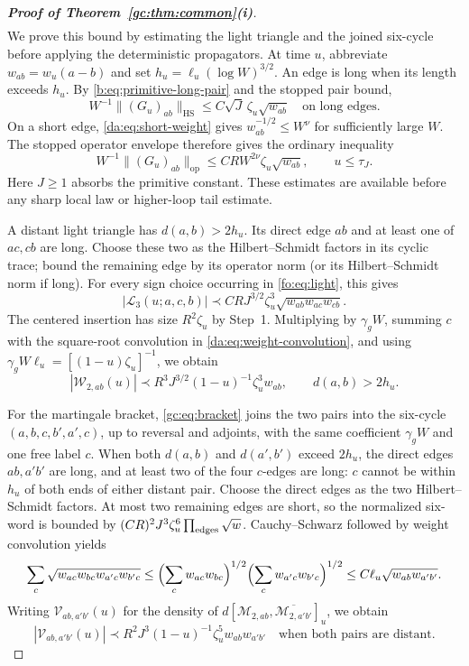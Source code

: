 \documentclass[11pt]{article}
\numberwithin{equation}{section}
\theoremstyle{remark}
\newcommand{\cL}{\mathcal L}
\newcommand{\op}{\mathrm{op}}
\newcommand{\HS}{\mathrm{HS}}
\begin{document}
\begin{proof}[\textbf{Proof of Theorem~\ref{gc:thm:common}(i)}]
\begin{equation}
\begin{aligned}
 \end{aligned}
\end{equation}
We prove this bound by estimating the light triangle and the joined
six-cycle before applying the deterministic propagators.
At time $u$, abbreviate $w_{ab}=w_u(a-b)$ and set
$h_u=\ell_u(\log W)^{3/2}$. An edge is long when its length exceeds
$h_u$. By \eqref{b:eq:primitive-long-pair} and the stopped pair bound,
\[
 W^{-1}\|(G_u)_{ab}\|_{\HS}
 \le C\sqrt J\,\zeta_u\sqrt{w_{ab}}\quad\text{on long edges}.
\]
On a short edge, \eqref{da:eq:short-weight} gives
$w_{ab}^{-1/2}\le W^\nu$ for sufficiently large $W$.
The stopped operator envelope therefore gives the ordinary inequality
\[
 W^{-1}\|(G_u)_{ab}\|_{\op}
 \le CRW^{2\nu}\zeta_u\sqrt{w_{ab}},\qquad u\le\tau_J.
\]
Here $J\ge1$ absorbs the primitive constant. These estimates are
available before any sharp local law or higher-loop tail estimate.

A distant light triangle has $d(a,b)>2h_u$. Its direct edge $ab$
and at least one of $ac,cb$ are long. Choose these two as the
Hilbert--Schmidt factors in its cyclic trace; bound the remaining
edge by its operator norm (or its Hilbert--Schmidt norm if long).
For every sign choice occurring in \eqref{fo:eq:light}, this gives
\[
 |\cL_3(u;a,c,b)|\prec
 CRJ^{3/2}\zeta_u^3\sqrt{w_{ab}w_{ac}w_{cb}}.
\]
The centered insertion has size $R^2\zeta_u$ by Step~1. Multiplying
by $\gamma_gW$, summing $c$ with the square-root convolution in
\eqref{da:eq:weight-convolution}, and using
$\gamma_gW\ell_u=[(1-u)\zeta_u]^{-1}$, we obtain
\begin{equation}\label{fo:eq:pair-far-light}
 |\mathcal W_{2,ab}(u)|\prec
 R^3J^{3/2}(1-u)^{-1}\zeta_u^3w_{ab},\qquad d(a,b)>2h_u.
\end{equation}

For the martingale bracket, \eqref{gc:eq:bracket} joins the two pairs
into the six-cycle $(a,b,c,b',a',c)$, up to reversal and adjoints,
with the same coefficient $\gamma_gW$ and one free label $c$.
When both $d(a,b)$ and $d(a',b')$ exceed $2h_u$, the direct edges
$ab,a'b'$ are long, and at least two of the four $c$-edges are long:
$c$ cannot be within $h_u$ of both ends of either distant pair.
Choose the direct edges as the two Hilbert--Schmidt factors.
At most two remaining edges are short, so the normalized six-word
is bounded by $(CR)^2J^3\zeta_u^6\prod_{\rm edges}\sqrt w$.
Cauchy--Schwarz followed by weight convolution yields
\[
 \sum_c\sqrt{w_{ac}w_{bc}w_{a'c}w_{b'c}}
 \le\Bigl(\sum_cw_{ac}w_{bc}\Bigr)^{1/2}
      \Bigl(\sum_cw_{a'c}w_{b'c}\Bigr)^{1/2}
 \le C\ell_u\sqrt{w_{ab}w_{a'b'}}.
\]
Writing $\mathcal V_{ab,a'b'}(u)$ for the density of
$d[\mathcal M_{2,ab},\overline{\mathcal M_{2,a'b'}}]_u$, we obtain
\begin{equation}\label{fo:eq:pair-far-bracket}
 |\mathcal V_{ab,a'b'}(u)|\prec
 R^2J^3(1-u)^{-1}\zeta_u^5w_{ab}w_{a'b'}
 \quad\text{when both pairs are distant}.
\end{equation}


\end{proof}
\end{document}
